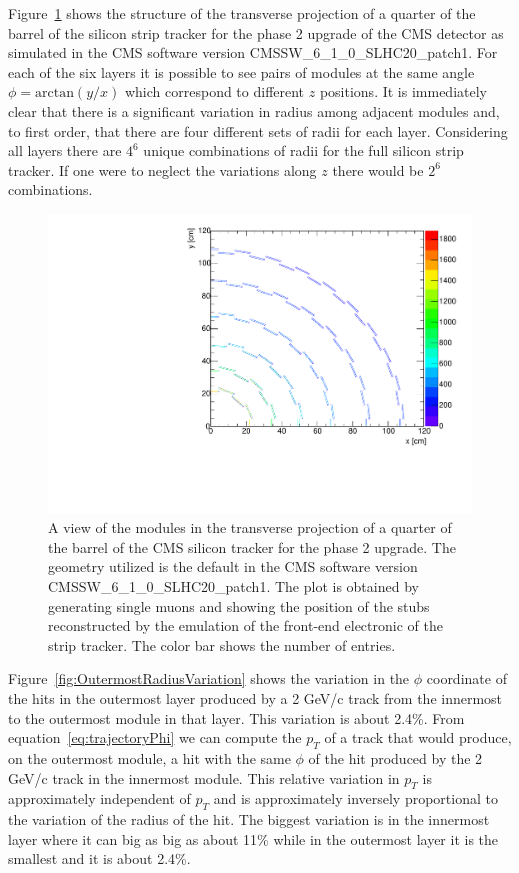 \documentclass[10pt,a4paper]{report}
\begin{document}
Figure~\ref{fig:quarterTransverseView} shows the structure of the transverse projection of a quarter of the barrel of the silicon strip tracker for the phase 2 upgrade of the CMS detector as simulated in the CMS software version CMSSW\_6\_1\_0\_SLHC20\_patch1. For each of the six layers it is possible to see pairs of modules at the same angle $\phi = \mbox{arctan}(y/x)$ which correspond to different $z$ positions. It is immediately clear that there is a significant variation in radius among adjacent modules and, to first order, that there are four different sets of radii for each layer. Considering all layers there are $4^6$ unique combinations of radii for the full silicon strip tracker. If one were to neglect the variations along $z$ there would be $2^6$ combinations.
\begin{figure}
\includegraphics[width=\textwidth]{Figures/QuarterTransverseView.pdf}
\caption{A view of the modules in the transverse projection of a quarter of the barrel of the CMS silicon tracker for the phase 2 upgrade. The geometry utilized is the default in the CMS software version CMSSW\_6\_1\_0\_SLHC20\_patch1. The plot is obtained by generating single muons and showing the position of the stubs reconstructed by the emulation of the front-end electronic of the strip tracker. The color bar shows the number of entries.}
\label{fig:quarterTransverseView}
\end{figure}

Figure~\ref{fig:OutermostRadiusVariation} shows the variation in the $\phi$ coordinate of the hits  in the outermost layer produced by a 2 GeV/c track from the innermost to the outermost module in that layer. This variation is about 2.4\%. From equation~\ref{eq:trajectoryPhi} we can compute the $p_T$ of a track that would produce, on the outermost module, a hit with the same $\phi$ of the hit produced by the 2 GeV/c track in the innermost module. This relative variation in $p_T$ is approximately independent of $p_T$ and is approximately inversely proportional to the variation of the radius of the hit. The biggest variation is in the innermost layer where it can big as big as about 11\% while in the outermost layer it is the smallest and it is about 2.4\%.
\end{document}
